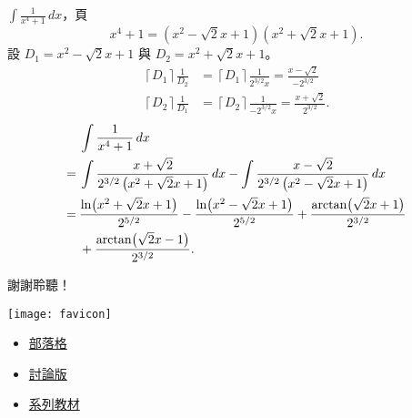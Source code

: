 \documentclass{beamer}
\newcommand{\Left} {\mathopen{}\mathclose\bgroup\left}
\newcommand{\Right}{\aftergroup\egroup\right}
\theoremstyle{remark}
\begin{document}
\begin{CJK}{UTF8}{bsmi}
\begin{frame}[allowframebreaks]{$\displaystyle \int \frac{1}{x^4 + 1}\,dx$，頁}
  \[x^4 + 1 = \left( x^2 - \sqrt2 x + 1 \right) \left( x^2 + \sqrt2 x + 1 \right).\]
  設 $D_1 = x^2 - \sqrt2 x + 1$ 與 $D_2 = x^2 + \sqrt2 x + 1$。
  \begin{align*}
    \left\lceil D_1 \right\rceil \frac{1}{D_2} &= \left\lceil D_1 \right\rceil \frac{1}{2^{3/2} x}
      = \frac{x - \sqrt2}{-2^{3/2}}\\
    \left\lceil D_2 \right\rceil \frac{1}{D_1} &= \left\lceil D_2 \right\rceil \frac{1}{-2^{3/2} x}
      = \frac{x + \sqrt2}{2^{3/2}}.
  \end{align*}
  \begin{align*}
       & \int \frac{1}{x^4 + 1}\,dx\\
    =\:& \int \frac{x + \sqrt2}{2^{3/2} \left( x^2 + \sqrt2 x + 1 \right)}\,dx
	 - \int \frac{x - \sqrt2}{2^{3/2} \left( x^2 - \sqrt2 x + 1 \right)}\,dx\\
    =\:& \frac{\ln \Left( x^2 + \sqrt2 x + 1 \Right)}{2^{5/2}} - \frac{\ln \Left( x^2 - \sqrt2 x + 1 \Right)}{2^{5/2}}
	 + \frac{\arctan \Left( \sqrt2 x + 1 \Right)}{2^{3/2}}\\
    \phantom=\:& +\frac{\arctan \Left( \sqrt2 x - 1 \Right)}{2^{3/2}}.
  \end{align*}
\end{frame}

\begin{frame}{謝謝聆聽！}
  \begin{center}
    \texttt{[image: favicon]}
  \end{center}
  \begin{itemize}
    \item \href{http://jdh8.org/}{部落格}
    \item \href{http://boards.jdh8.org/cal/}{討論版}
    \item \href{https://github.com/jdh8/calculus-2012}{系列教材}
  \end{itemize}
\end{frame}
\end{CJK}
\end{document}
